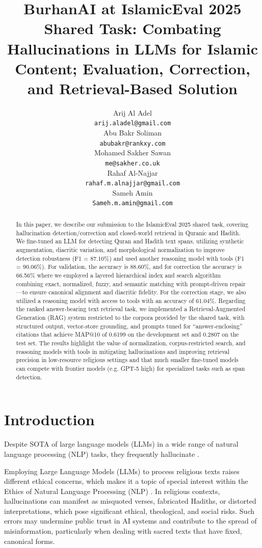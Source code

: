 \documentclass[11pt]{article}
\title{BurhanAI at IslamicEval 2025 Shared Task: Combating Hallucinations in LLMs for Islamic Content; Evaluation,
Correction, and Retrieval-Based Solution}
\author{ 
        Arij Al Adel           \\  \texttt{arij.aladel@gmail.com}     \\\And   
        Abu Bakr Soliman       \\  \texttt{abubakr@rankxy.com}        \\\And
        Mohamed Sakher Sawan    \\ \texttt{me@sakher.co.uk}   \\\AND 
        Rahaf Al-Najjar         \\ \texttt{rahaf.m.alnajjar@gmail.com} \\\And
        Sameh Amin              \\ \texttt{Sameh.m.amin@gmail.com} \\     
}
\begin{document}
\maketitle


\begin{abstract}
In this paper, we describe our submission to the IslamicEval 2025 shared task, covering hallucination detection/correction and closed-world retrieval in Quranic and Hadith. We fine-tuned an LLM for detecting Quran and Hadith text spans, utilizing synthetic augmentation, diacritic variation, and morphological normalization to improve detection robustness (F1 = 87.10\%) and used another reasoning model with tools (F1 = 90.06\%). For validation, the accuracy is 88.60\%, and for correction the accuracy is 66.56\% where we employed a layered hierarchical index and search algorithm combining exact, normalized, fuzzy, and semantic matching with prompt-driven repair—to ensure canonical alignment and diacritic fidelity. For the correction stage, we also utilized a reasoning model with access to tools with an accuracy of 61.04\%. Regarding the ranked answer-bearing text retrieval task, we implemented a Retrieval-Augmented Generation (RAG) system restricted to the corpora provided by the shared task, with structured output, vector-store grounding, and prompts tuned for “answer-enclosing” citations that achieve MAP@10 of 0.6199 on the development set and 0.2807 on the test set. 
The results highlight the value of normalization, corpus-restricted search, and reasoning models with tools in mitigating hallucinations and improving retrieval precision in low-resource religious settings and that much smaller fine-tuned models can compete with frontier models (e.g. GPT-5 high) for specialized tasks such as span detection.

\end{abstract}

\section{Introduction}

Despite SOTA of large language models (LLMs) in a wide range of natural language processing (NLP) tasks, they frequently hallucinate \citet{Li2024BanishingLH, Hikal2025MSAAS, Orgad2024LLMsKM}.

Employing Large Language Models (LLMs) to process religious texts \citet{Ganadi2025GenerativeAF, Mohammed2025AftinaES} raises different ethical concerns, which makes it a topic of special interest within the Ethics of Natural Language Processing (NLP) \citet{Hutchinson2024ModelingTS}. In religious contexts, hallucinations can manifest as misquoted verses, fabricated Hadiths, or distorted interpretations, which pose significant ethical, theological, and social risks. Such errors may undermine public trust in AI systems and contribute to the spread of misinformation, particularly when dealing with sacred texts that have fixed, canonical forms.
\end{document}
